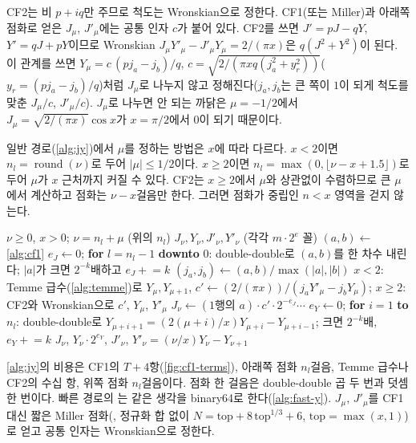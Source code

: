 CF2는 비 $p+iq$만 주므로 척도는 Wronskian으로 정한다. CF1(또는 Miller)과 아래쪽 점화로 얻은 $J_\mu$, $J'_\mu$에는 공통 인자 $c$가 붙어 있다. CF2를 쓰면 $J'=pJ-qY$, $Y'=qJ+pY$이므로 Wronskian $J_\mu Y'_\mu-J'_\mu Y_\mu=2/(\pi x)$은 $q(J^2+Y^2)$이 된다. 이 관계를 쓰면 $Y_\mu=c\,(pj_a-j_b)/q$, $c=\sqrt{2/(\pi xq(j_a^2+y_r^2))}$($y_r=(pj_a-j_b)/q$)처럼 $J_\mu$로 나누지 않고 정해진다($j_a,j_b$는 큰 쪽이 $1$이 되게 척도를 맞춘 $J_\mu/c$, $J'_\mu/c$). $J_\mu$로 나누면 안 되는 까닭은 $\mu=-1/2$에서 $J_\mu=\sqrt{2/(\pi x)}\cos x$가 $x=\pi/2$에서 $0$이 되기 때문이다.

일반 경로(\cref{alg:jy})에서 $\mu$를 정하는 방법은 $x$에 따라 다르다. $x<2$이면 $n_l=\operatorname{round}(\nu)$로 두어 $|\mu|\le1/2$이다. $x\ge2$이면 $n_l=\max(0,\lfloor\nu-x+1.5\rfloor)$로 두어 $\mu$가 $x$ 근처까지 커질 수 있다. CF2는 $x\ge2$에서 $\mu$와 상관없이 수렴하므로 큰 $\mu$에서 계산하고 점화는 $\nu-x$걸음만 한다. 그러면 점화가 중립인 $n<x$ 영역을 걷지 않는다.

\begin{algorithm}[htbp]
\begin{algorithmic}[1]
\Require $\nu\ge0$, $x>0$; $\nu=n_l+\mu$ (위의 $n_l$)
\Ensure $J_\nu,Y_\nu,J'_\nu,Y'_\nu$ (각각 $m\cdot2^e$ 꼴)
\State $(a,b)\gets$ \cref{alg:cf1} 
\State $e_J\gets0$; \textbf{for} $l=n_l-1$ \textbf{downto} $0$: double-double로 $(a,b)$를 한 차수 내린다; $|a|$가 크면 $2^{-k}$배하고 $e_J\mathrel{+}=k$
\State $(j_a,j_b)\gets(a,b)/\max(|a|,|b|)$ 
\State $x<2$: Temme 급수(\cref{alg:temme})로 $Y_\mu,Y_{\mu+1}$, $c'\gets(2/(\pi x))/(j_aY'_\mu-j_bY_\mu)$; $x\ge2$: CF2와 Wronskian으로 $c'$, $Y_\mu$, $Y'_\mu$
\State $J_\nu\gets(\text{1행의 }a)\cdot c'\cdot2^{-e_J}\cdots$ 
\State $e_Y\gets0$; \textbf{for} $i=1$ \textbf{to} $n_l$: double-double로 $Y_{\mu+i+1}=(2(\mu+i)/x)Y_{\mu+i}-Y_{\mu+i-1}$; 크면 $2^{-k}$배, $e_Y\mathrel{+}=k$
\State \Return $J_\nu$, $Y_\nu\cdot2^{e_Y}$, $J'_\nu$, $Y'_\nu=(\nu/x)Y_\nu-Y_{\nu+1}$
\end{algorithmic}
\caption{Temme--Steed 방법의 골격 (stardust 의 )}
\label{alg:jy}
\end{algorithm}

\cref{alg:jy}의 비용은 CF1의 $T+4$항(\cref{fig:cf1-terms}), 아래쪽 점화 $n_l$걸음, Temme 급수나 CF2의 수십 항, 위쪽 점화 $n_l$걸음이다. 점화 한 걸음은 double-double 곱 두 번과 덧셈 한 번이다. 빠른 경로의 는 같은 생각을 binary64로 한다(\cref{alg:fast-y}). $J_\mu$, $J'_\mu$를 CF1 대신 짧은 Miller 점화(, 정규화 합 없이 $N=\mathrm{top}+8\,\mathrm{top}^{1/3}+6$, $\mathrm{top}=\max(x,1)$)로 얻고 공통 인자는 Wronskian으로 정한다.

